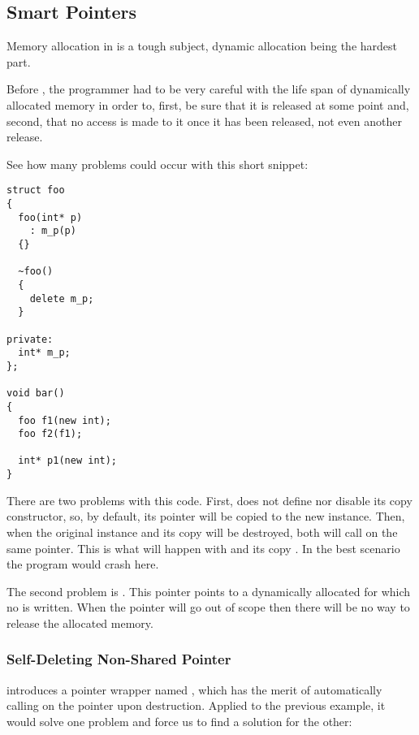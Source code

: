 \subsection{Smart Pointers}

Memory allocation in \cpp{} is a tough subject, dynamic allocation
being the hardest part.

Before , the programmer had to be very careful with the life
span of dynamically allocated memory in order to, first, be sure that
it is released at some point and, second, that no access is made to it
once it has been released, not even another release.

See how many problems could occur with this short snippet:

\begin{lstlisting}
struct foo
{
  foo(int* p)
    : m_p(p)
  {}

  ~foo()
  {
    delete m_p;
  }

private:
  int* m_p;
};

void bar()
{
  foo f1(new int);
  foo f2(f1);

  int* p1(new int);
}
\end{lstlisting}

There are two problems with this code. First,  does not
define nor disable its copy constructor, so, by default, its
 pointer will be copied to the new instance. Then, when the
original instance and its copy will be destroyed, both will call
 on the same pointer. This is what will happen with
 and its copy . In the best scenario the program
would crash here.

The second problem is . This pointer points to a dynamically
allocated  for which no  is written. When the
pointer will go out of scope then there will be no way to release the
allocated memory.

\subsubsection{Self-Deleting Non-Shared Pointer}
\label{sec:unique_ptr}

%
%
 introduces a pointer wrapper named ,
which has the merit of automatically calling  on the
pointer upon destruction. Applied to the previous example, it would
solve one problem and force us to find a solution for the other:

